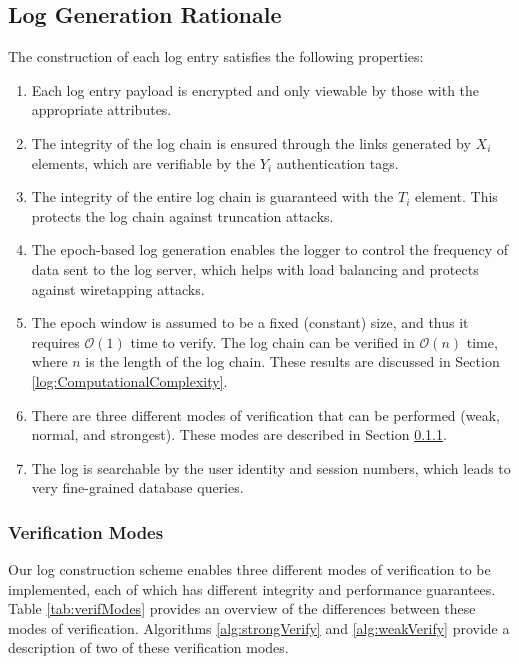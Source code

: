 \documentclass{sig-alternate}
\begin{document}
\subsection{Log Generation Rationale}
The construction of each log entry satisfies the following properties:
\begin{enumerate}
  \item Each log entry payload is encrypted and only viewable by those with the appropriate attributes.
  \item The integrity of the log chain is ensured through the links generated by $X_i$ elements, which are verifiable by the $Y_i$ authentication tags.
  \item The integrity of the entire log chain is guaranteed with the $T_i$ element. This protects the log chain against truncation attacks.
  \item The epoch-based log generation enables the logger to control the frequency of data
  sent to the log server, which helps with load balancing and protects against wiretapping attacks.
  \item The epoch window is assumed to be a fixed (constant) size, and thus it requires $\mathcal{O}(1)$ time to verify. The log chain can be verified in $\mathcal{O}(n)$ time, where $n$ is the length of the log chain. These results are discussed in Section \ref{log:ComputationalComplexity}.
  \item There are three different modes of verification that can be performed (weak, normal, and strongest). These modes are described in Section \ref{log:VerificationModes}.
  \item The log is searchable by the user identity and session numbers, which leads to very fine-grained database queries. 
\end{enumerate}

\subsubsection{Verification Modes}
\label{log:VerificationModes}

Our log construction scheme enables three different modes of verification to be implemented,
each of which has different integrity and performance guarantees. Table \ref{tab:verifModes} 
provides an overview of the differences between these modes of verification. Algorithms \ref{alg:strongVerify}
and \ref{alg:weakVerify} provide a description of two of these verification modes.
\end{document}
